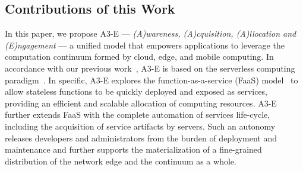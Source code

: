 
%


\subsection{Contributions of this Work}

In this paper, we propose A3-E --- \textit{(A)wareness, (A)cquisition, (A)llocation and (E)ngagement} --- a unified model that empowers applications to leverage the computation continuum formed by cloud, edge, and mobile computing. In accordance with our previous work~\cite{GarrigaMendonca2017}, A3-E is based on the serverless computing paradigm~\cite{Hendrickson:2016,baldini2017serverless}. In specific, A3-E explores the function-as-a-service (FaaS) model~\cite{MateosFaaster17} to allow stateless functions to be quickly deployed and exposed as services, providing an efficient and scalable allocation of computing resources. A3-E further extends FaaS with the complete automation of services life-cycle, including the acquisition of service artifacts by servers. Such an autonomy releases developers and administrators from the burden of deployment and maintenance and further supports the materialization of a fine-grained distribution of the network edge and the continuum as a whole. %



